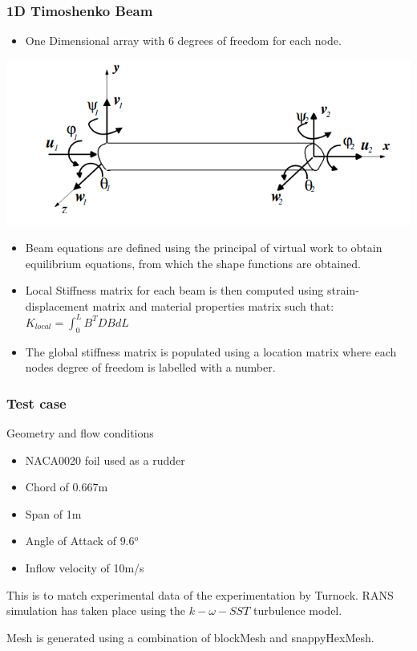 \documentclass{beamer}
\begin{document}
	\begin{frame}
		\frametitle{1D Timoshenko Beam}
		\begin{itemize}
			\item One Dimensional array with 6 degrees of freedom for each node.
		\end{itemize}
	\centering
	\includegraphics[scale=0.35]{6_dof_beam.png}
	\begin{itemize}
		\small
		\item Beam equations are defined using the principal of virtual work to obtain equilibrium equations, from which the shape functions are obtained.
		\item Local Stiffness matrix for each beam is then computed using strain-displacement matrix and material properties matrix such that: $K_{local} = \int_{0}^{L} B^T D B dL$
		\item The global stiffness matrix is populated using a location matrix where each nodes degree of freedom is labelled with a number.
	\end{itemize}
	\end{frame}
	\begin{frame}
		\frametitle{Test case}
		Geometry and flow conditions
		\begin{itemize}
			\item NACA0020 foil used as a rudder
			\item Chord of 0.667m
			\item Span of 1m
			\item Angle of Attack of $9.6{^o}$
			\item Inflow velocity of 10m/s 
		\end{itemize}
	This is to match experimental data of the experimentation by Turnock.
	RANS simulation has taken place using the $k-\omega-SST$ turbulence model.
	
	Mesh is generated using a combination of blockMesh and snappyHexMesh.
	\end{frame}
\end{document}
